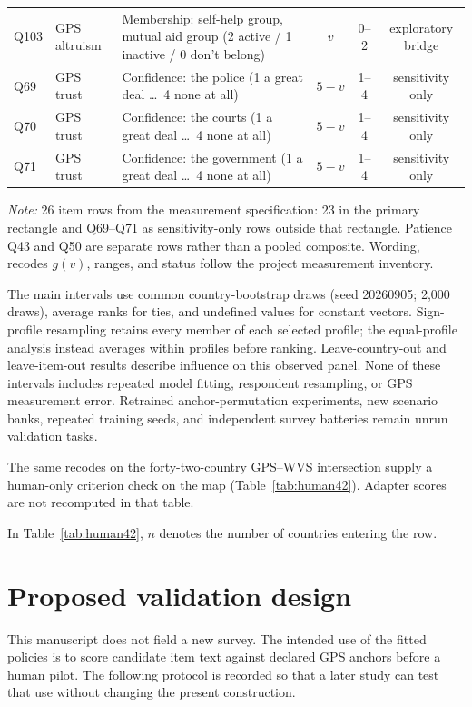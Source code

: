 \begin{table}[p]
\begin{tabularx}{\textwidth}{llXccc}
Q103 & GPS altruism & Membership: self-help group, mutual aid group (2 active / 1 inactive / 0 don't belong) & $v$ & 0--2 & exploratory bridge \\
Q69 & GPS trust & Confidence: the police (1 a great deal \dots\ 4 none at all) & $5-v$ & 1--4 & sensitivity only \\
Q70 & GPS trust & Confidence: the courts (1 a great deal \dots\ 4 none at all) & $5-v$ & 1--4 & sensitivity only \\
Q71 & GPS trust & Confidence: the government (1 a great deal \dots\ 4 none at all) & $5-v$ & 1--4 & sensitivity only \\
\bottomrule
\end{tabularx}
\par\vspace{3pt}
\raggedright\emph{Note:} 26 item rows from the measurement specification: 23 in the primary rectangle and Q69--Q71 as sensitivity-only rows outside that rectangle. Patience Q43 and Q50 are separate rows rather than a pooled composite. Wording, recodes $g(v)$, ranges, and status follow the project measurement inventory.
\end{table}

The main intervals use common country-bootstrap draws (seed 20260905; 2,000 draws), average ranks for ties, and undefined values for constant vectors. Sign-profile resampling retains every member of each selected profile; the equal-profile analysis instead averages within profiles before ranking. Leave-country-out and leave-item-out results describe influence on this observed panel. None of these intervals includes repeated model fitting, respondent resampling, or GPS measurement error. Retrained anchor-permutation experiments, new scenario banks, repeated training seeds, and independent survey batteries remain unrun validation tasks.

The same recodes on the forty-two-country GPS--WVS intersection supply a human-only criterion check on the map (Table~\ref{tab:human42}). Adapter scores are not recomputed in that table.

In Table~\ref{tab:human42}, $n$ denotes the number of countries entering the row.



\section{Proposed validation design}\label{app:humanscreen}
This manuscript does not field a new survey. The intended use of the fitted policies is to score candidate item text against declared GPS anchors before a human pilot. The following protocol is recorded so that a later study can test that use without changing the present construction.

